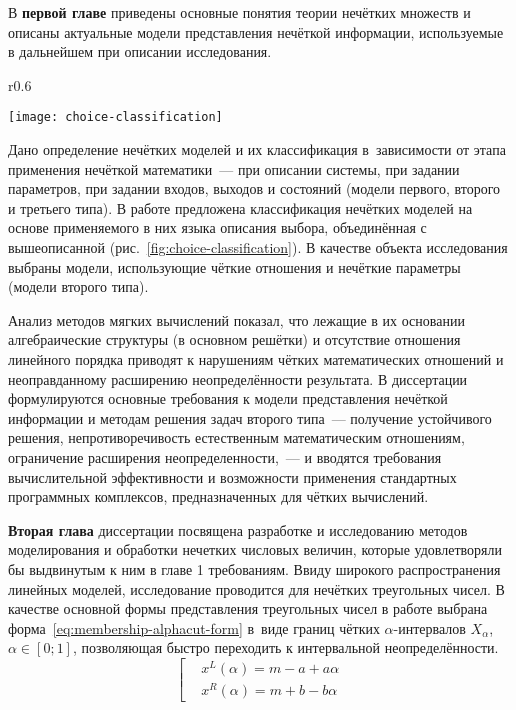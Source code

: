 В \textbf{первой главе} приведены основные понятия теории нечётких множеств и описаны актуальные модели представления нечёткой информации, используемые в дальнейшем при описании исследования. 
\begin{wrapfigure}{r}{0.6\textwidth}
  \begin{center}
    \texttt{[image: choice-classification]}
  \end{center}
  \caption{Предлагаемая классификация нечётких моделей} 
  \label{fig:choice-classification}
\end{wrapfigure}
Дано определение нечётких моделей и их классификация в~зависимости от этапа применения нечёткой математики~--- при описании системы, при задании параметров, при задании входов, выходов и состояний (модели первого, второго и третьего типа). В работе предложена классификация нечётких моделей на основе применяемого в них языка описания выбора, объединённая с вышеописанной (рис.~\ref{fig:choice-classification}). В качестве объекта исследования выбраны модели, использующие чёткие отношения и нечёткие параметры (модели второго типа).

Анализ методов мягких вычислений показал, что лежащие в их основании алгебраические структуры (в основном решётки) и отсутствие отношения линейного порядка приводят к нарушениям чётких математических отношений и неоправданному расширению неопределённости результата. В диссертации формулируются основные требования к модели представления нечёткой информации и методам решения задач второго типа~--- получение устойчивого решения, непротиворечивость естественным математическим отношениям, ограничение расширения неопределенности,~--- и вводятся требования вычислительной эффективности и возможности применения стандартных программных комплексов, предназначенных для чётких вычислений.

\textbf{Вторая глава} диссертации посвящена разработке и исследованию методов моделирования и обработки нечетких числовых величин, которые удовлетворяли бы выдвинутым к ним в главе 1 требованиям. Ввиду широкого распространения линейных моделей, исследование проводится для нечётких треугольных чисел. В качестве основной формы представления треугольных чисел в работе выбрана форма~\eqref{eq:membership-alphacut-form} в~виде границ чётких $\alpha$-интервалов $X_\alpha$, $\alpha \in \left[ 0;1 \right]$, позволяющая быстро переходить к интервальной неопределённости.
\begin{equation}
\label{eq:membership-alphacut-form}
	\left[ 
		\begin{aligned}
			& x^L(\alpha )=m-a+a\alpha  \\ 
			& x^R(\alpha )=m+b-b\alpha
		 \end{aligned}
	\right.
\end{equation}

